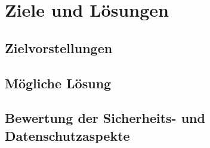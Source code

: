 \pagebreak
\section{Ziele und Lösungen}
\subsection{Zielvorstellungen}
\subsection{Mögliche Lösung}
\subsection{Bewertung der Sicherheits- und Datenschutzaspekte}